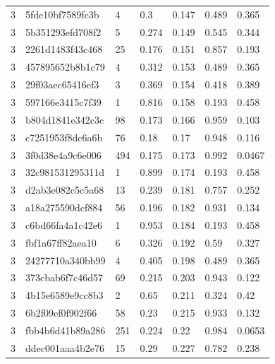 \begin{tabular}{lllllll}
3 & 5fde10bf7589fc3b & 4 & 0.3 & 0.147 & 0.489 & 0.365 \\
3 & 5b351293efd708f2 & 5 & 0.274 & 0.149 & 0.545 & 0.344 \\
3 & 2261d1483f43c468 & 25 & 0.176 & 0.151 & 0.857 & 0.193 \\
3 & 457895652b8b1c79 & 4 & 0.312 & 0.153 & 0.489 & 0.365 \\
3 & 29f03aec65416ef3 & 3 & 0.369 & 0.154 & 0.418 & 0.389 \\
3 & 597166e3415c7f39 & 1 & 0.816 & 0.158 & 0.193 & 0.458 \\
3 & b804d1841e342c3c & 98 & 0.173 & 0.166 & 0.959 & 0.103 \\
3 & c7251953f8dc6a6b & 76 & 0.18 & 0.17 & 0.948 & 0.116 \\
3 & 3f0d38e4a9c6e006 & 494 & 0.175 & 0.173 & 0.992 & 0.0467 \\
3 & 32c981531295311d & 1 & 0.899 & 0.174 & 0.193 & 0.458 \\
3 & d2ab3e082c5c5a68 & 13 & 0.239 & 0.181 & 0.757 & 0.252 \\
3 & a18a275590dcf884 & 56 & 0.196 & 0.182 & 0.931 & 0.134 \\
3 & c6bd66fa4a1c42e6 & 1 & 0.953 & 0.184 & 0.193 & 0.458 \\
3 & fbf1a67ff82aea10 & 6 & 0.326 & 0.192 & 0.59 & 0.327 \\
3 & 24277710a340bb99 & 4 & 0.405 & 0.198 & 0.489 & 0.365 \\
3 & 373cbab6f7c46d57 & 69 & 0.215 & 0.203 & 0.943 & 0.122 \\
3 & 4b15e6589e9cc8b3 & 2 & 0.65 & 0.211 & 0.324 & 0.42 \\
3 & 6b2f09ef0f902f66 & 58 & 0.23 & 0.215 & 0.933 & 0.132 \\
3 & fbb4b6d41b89a286 & 251 & 0.224 & 0.22 & 0.984 & 0.0653 \\
3 & ddec001aaa4b2e76 & 15 & 0.29 & 0.227 & 0.782 & 0.238 \\
\bottomrule
\end{tabular}